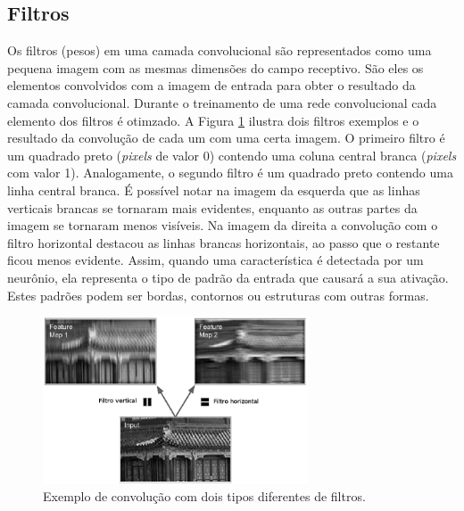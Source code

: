 \subsection{Filtros}
Os filtros (pesos) em uma camada convolucional são representados como uma pequena
imagem com as mesmas dimensões do campo receptivo. São eles os elementos
convolvidos com a imagem de entrada para obter o resultado da camada convolucional.
Durante o treinamento de uma rede convolucional cada elemento dos filtros é otimzado.
A Figura \ref{fig:conv_filt} ilustra dois filtros exemplos e o resultado da convolução
de cada um com uma certa imagem. O primeiro filtro é um quadrado preto
(\textit{pixels} de valor 0) contendo uma coluna central branca (\textit{pixels} com valor 1). 
Analogamente, o segundo filtro é um quadrado preto contendo uma linha central branca.
É possível notar na imagem da esquerda que as linhas verticais brancas se tornaram mais
evidentes, enquanto as outras partes da imagem se tornaram menos visíveis. Na imagem da direita 
a convolução com o filtro horizontal destacou as linhas brancas horizontais, ao passo que
o restante ficou menos evidente. Assim, quando uma característica é detectada por um neurônio, ela representa
o tipo de padrão da entrada que causará a sua ativação.
Estes padrões podem ser bordas, contornos ou estruturas com outras formas.
\begin{figure}[htp]
\begin{center}
  \includegraphics[width=0.7\textwidth]{fig/conv_filt}
  \caption{Exemplo de convolução com dois tipos diferentes de filtros. \citep{aurelien17}}
  \label{fig:conv_filt}
\end{center}
\end{figure}

